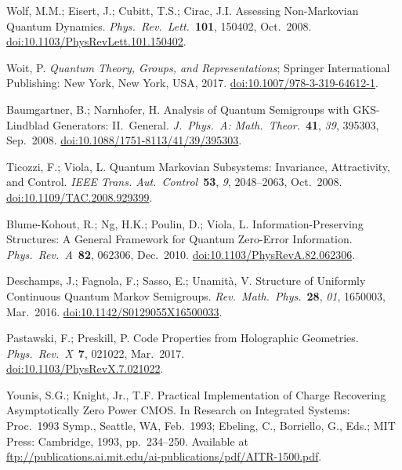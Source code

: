\documentclass[preprints,article,accept,moreauthors,pdftex]{Definitions/mdpi}
\begin{document}
\begin{thebibliography}{999}
Wolf, M.M.; Eisert, J.; Cubitt, T.S.; Cirac, J.I\@. Assessing Non-Markovian Quantum Dynamics. {\em Phys.\ Rev.\ Lett.}\ {\bf 101}, 150402, Oct.\ 2008. \href{https://doi.org/10.1103/PhysRevLett.101.150402}{doi:10.1103/PhysRevLett.101.150402}.

Woit, P\@. \emph{Quantum Theory, Groups, and Representations}; Springer International Publishing: New York, New York, USA, 2017. \href{https://doi.org/10.1007/978-3-319-64612-1}{doi:10.1007/978-3-319-64612-1}.

Baumgartner, B.; Narnhofer, H\@. Analysis of Quantum Semigroups with GKS-Lindblad Generators: II.\ General. {\em J.\ Phys.\ A: Math.\ Theor.}\ {\bf 41}, {\em 39}, 395303, Sep.\ 2008. \href{https://doi.org/10.1088/1751-8113/41/39/395303}{doi:10.1088/1751-8113/41/39/395303}.

Ticozzi, F.; Viola, L\@. Quantum Markovian Subsystems: Invariance, Attractivity, and Control. {\em IEEE Trans. Aut.\ Control}\ {\bf 53}, {\em 9}, 2048--2063, Oct.\ 2008. \href{https://doi.org/10.1109/TAC.2008.929399}{doi:10.1109/TAC.2008.929399}.

Blume-Kohout, R.; Ng, H.K.; Poulin, D.; Viola, L\@. Information-Preserving Structures: A General Framework for Quantum Zero-Error Information. {\em Phys.\ Rev.\ A}\ {\bf 82}, 062306, Dec.\ 2010. \href{https://doi.org/10.1103/PhysRevA.82.062306}{doi:10.1103/PhysRevA.82.062306}.

Deschamps, J.; Fagnola, F.; Sasso, E.; Unamità, V\@. Structure of Uniformly Continuous Quantum Markov Semigroups. {\em Rev.\ Math.\ Phys.}\ {\bf 28}, {\em 01}, 1650003, Mar.\ 2016. \href{https://doi.org/10.1142/S0129055X16500033}{doi:10.1142/S0129055X16500033}.

Pastawski, F.; Preskill, P\@. Code Properties from Holographic Geometries. {\em Phys.\ Rev.\ X}\ {\bf 7}, 021022, Mar.\ 2017.
\\[0pt]
\href{https://doi.org/10.1103/PhysRevX.7.021022}{doi:10.1103/PhysRevX.7.021022}.

Younis, S.G.; Knight, Jr., T.F\@. Practical Implementation of Charge Recovering Asymptotically Zero Power CMOS. In Research on Integrated Systems: Proc.\ 1993 Symp., Seattle, WA, Feb.\ 1993; Ebeling, C., Borriello, G., Eds.; MIT Press: Cambridge, 1993, pp.~234--250. Available at \href{ftp://publications.ai.mit.edu/ai-publications/pdf/AITR-1500.pdf}{ftp://publications.ai.mit.edu/ai-publications/pdf/AITR-1500.pdf}.


\end{thebibliography}
\end{document}
